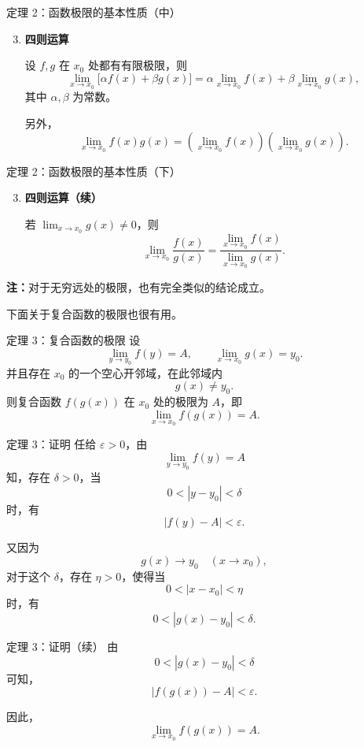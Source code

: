 ﻿\documentclass[aspectratio=169,11pt]{ctexbeamer}
\begin{document}
\begin{frame}{定理 2：函数极限的基本性质（中）}
\begin{enumerate}
\setcounter{enumi}{2}
  \item \textbf{四则运算}\par
  设 $f,g$ 在 $x_0$ 处都有有限极限，则
  \[
    \lim_{x\to x_0}\bigl[\alpha f(x)+\beta g(x)\bigr]
    =
    \alpha\lim_{x\to x_0}f(x)+\beta\lim_{x\to x_0}g(x),
  \]
  其中 $\alpha,\beta$ 为常数。

  \vspace{0.6em}
  另外，
  \[
    \lim_{x\to x_0} f(x)g(x)
    =
    \left(\lim_{x\to x_0} f(x)\right)
    \left(\lim_{x\to x_0} g(x)\right).
  \]
\end{enumerate}
\end{frame}

\begin{frame}{定理 2：函数极限的基本性质（下）}
\begin{enumerate}
\setcounter{enumi}{2}
  \item \textbf{四则运算（续）}\par
  若 $\displaystyle \lim_{x\to x_0}g(x)\ne 0$，则
  \[
    \lim_{x\to x_0}\frac{f(x)}{g(x)}
    =
    \frac{\lim_{x\to x_0}f(x)}{\lim_{x\to x_0}g(x)}.
  \]
\end{enumerate}

\vspace{0.8em}
\textbf{注：}对于无穷远处的极限，也有完全类似的结论成立。

\vspace{0.8em}
下面关于复合函数的极限也很有用。
\end{frame}

\begin{frame}{定理 3：复合函数的极限}
设
\[
  \lim_{y\to y_0} f(y)=A,\qquad \lim_{x\to x_0} g(x)=y_0.
\]
并且存在 $x_0$ 的一个空心开邻域，在此邻域内
\[
  g(x)\ne y_0.
\]
则复合函数 $f(g(x))$ 在 $x_0$ 处的极限为 $A$，即
\[
  \lim_{x\to x_0} f(g(x))=A.
\]
\end{frame}

\begin{frame}{定理 3：证明}
任给 $\varepsilon>0$，由
\[
  \lim_{y\to y_0} f(y)=A
\]
知，存在 $\delta>0$，当
\[
  0<|y-y_0|<\delta
\]
时，有
\[
  |f(y)-A|<\varepsilon.
\]

又因为
\[
  g(x)\to y_0\quad (x\to x_0),
\]
对于这个 $\delta$，存在 $\eta>0$，使得当
\[
  0<|x-x_0|<\eta
\]
时，有
\[
  0<|g(x)-y_0|<\delta.
\]
\end{frame}

\begin{frame}{定理 3：证明（续）}
由
\[
  0<|g(x)-y_0|<\delta
\]
可知，
\[
  |f(g(x))-A|<\varepsilon.
\]

因此，
\[
  \lim_{x\to x_0} f(g(x))=A.
\]
\end{frame}
\end{document}
